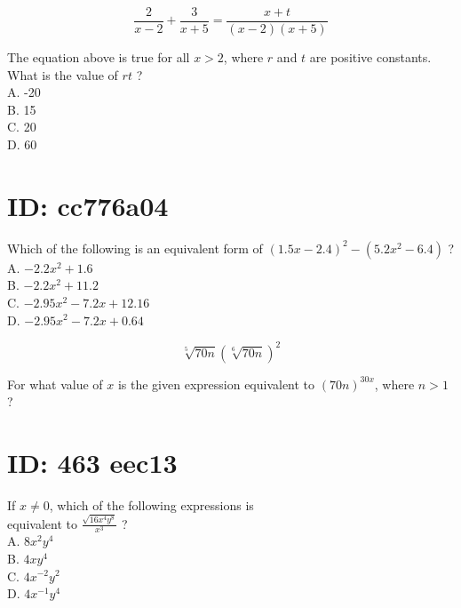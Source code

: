 $$
\frac{2}{x-2}+\frac{3}{x+5}=\frac{x+t}{(x-2)(x+5)}
$$

The equation above is true for all $x>2$, where $r$ and $t$ are positive constants. What is the value of $r t$ ?\\
A. -20\\
B. 15\\
C. 20\\
D. 60

\section*{ID: cc776a04}
Which of the following is an equivalent form of $(1.5 x-2.4)^{2}-\left(5.2 x^{2}-6.4\right)$ ?\\
A. $-2.2 x^{2}+1.6$\\
B. $-2.2 x^{2}+11.2$\\
C. $-2.95 x^{2}-7.2 x+12.16$\\
D. $-2.95 x^{2}-7.2 x+0.64$

$$
\sqrt[5]{70 n}(\sqrt[6]{70 n})^{2}
$$

For what value of $x$ is the given expression equivalent to $(70 n)^{30 x}$, where $n>1$ ?






































\section*{ID: 463 eec13}
If $x \neq 0$, which of the following expressions is\\
equivalent to $\frac{\sqrt{16 x^{4} y^{8}}}{x^{3}}$ ?\\
A. $8 x^{2} y^{4}$\\
B. $4 x y^{4}$\\
C. $4 x^{-2} y^{2}$\\
D. $4 x^{-1} y^{4}$

